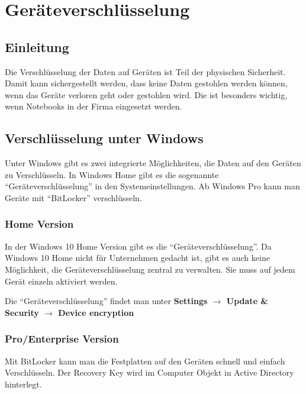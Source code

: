 \chapter{Geräteverschlüsselung}
\section{Einleitung}
Die Verschlüsselung der Daten auf Geräten ist Teil der physischen Sicherheit.
Damit kann sichergestellt werden, dass keine Daten gestohlen werden können, wenn das Geräte verloren geht oder gestohlen wird.
Die ist besonders wichtig, wenn Notebooks in der Firma eingesetzt werden.

\section{Verschlüsselung unter Windows}
Unter Windows gibt es zwei integrierte Möglichkeiten, die Daten auf den Geräten zu Verschlüsseln.
In Windows Home gibt es die sogenannte ``Geräteverschlüsselung'' in den Systemeinstellungen.
Ab Windows Pro kann man Geräte mit ``BitLocker'' verschlüsseln.\\

\subsection{Home Version}
In der Windows 10 Home Version gibt es die ``Geräteverschlüsselung''.
Da Windows 10 Home nicht für Unternehmen gedacht ist, gibt es auch keine Möglichkeit, die Geräteverschlüsselung zentral zu verwalten.
Sie muss auf jedem Gerät einzeln aktiviert werden.

Die ``Geräteverschlüsselung'' findet man unter \textbf{Settings $\rightarrow$ Update \& Security $\rightarrow$ Device encryption}

\subsection{Pro/Enterprise Version}
Mit BitLocker kann man die Festplatten auf den Geräten schnell und einfach Verschlüsseln.
Der Recovery Key wird im Computer Objekt in Active Directory hinterlegt.

